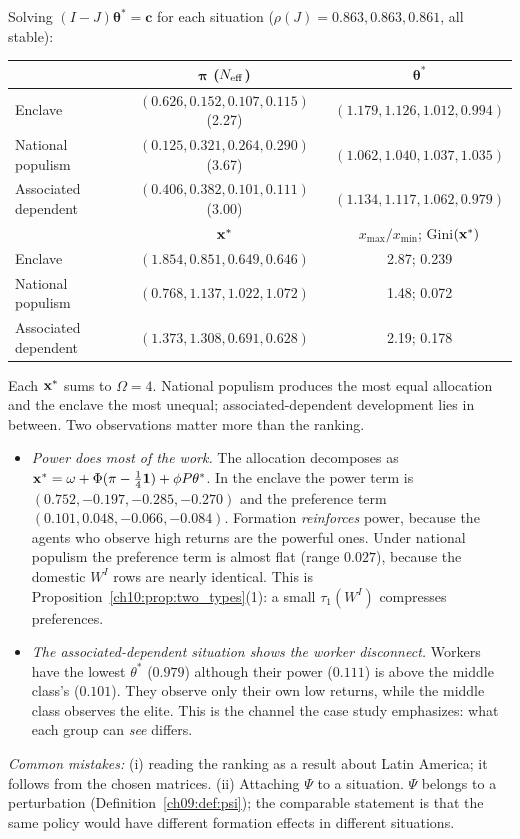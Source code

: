 \documentclass[../solutions_manual.tex]{subfiles}
\begin{document}
 Solving $(I - J)\boldsymbol{\theta}^* = \mathbf{c}$ for each situation ($\rho(J) = 0.863, 0.863, 0.861$, all stable):
\begin{center}
\small
\begin{tabular}{lcc}
\toprule
& $\boldsymbol{\pi}$ ($N_{\text{eff}}$) & $\boldsymbol{\theta}^*$ \\
\midrule
Enclave & $(0.626, 0.152, 0.107, 0.115)$ (2.27) & $(1.179, 1.126, 1.012, 0.994)$ \\
National populism & $(0.125, 0.321, 0.264, 0.290)$ (3.67) & $(1.062, 1.040, 1.037, 1.035)$ \\
Associated dependent & $(0.406, 0.382, 0.101, 0.111)$ (3.00) & $(1.134, 1.117, 1.062, 0.979)$ \\
\midrule
& $\mathbf{x}^*$ & $x_{\max}/x_{\min}$; Gini$(\mathbf{x}^*)$ \\
\midrule
Enclave & $(1.854, 0.851, 0.649, 0.646)$ & 2.87; 0.239 \\
National populism & $(0.768, 1.137, 1.022, 1.072)$ & 1.48; 0.072 \\
Associated dependent & $(1.373, 1.308, 0.691, 0.628)$ & 2.19; 0.178 \\
\bottomrule
\end{tabular}
\end{center}
Each $\mathbf{x}^*$ sums to $\Omega = 4$. National populism produces the most equal allocation and the enclave the most unequal; associated-dependent development lies in between. Two observations matter more than the ranking.
\begin{itemize}
\item \textit{Power does most of the work.} The allocation decomposes as $\mathbf{x}^* = \omega + \Phi(\pi - \tfrac14\mathbf{1}) + \phi P\theta^*$. In the enclave the power term is $(0.752, -0.197, -0.285, -0.270)$ and the preference term $(0.101, 0.048, -0.066, -0.084)$. Formation \emph{reinforces} power, because the agents who observe high returns are the powerful ones. Under national populism the preference term is almost flat (range $0.027$), because the domestic $W^I$ rows are nearly identical. This is Proposition~\ref{ch10:prop:two_types}(1): a small $\tau_1(W^I)$ compresses preferences.
\item \textit{The associated-dependent situation shows the worker disconnect.} Workers have the lowest $\theta^*$ ($0.979$) although their power ($0.111$) is above the middle class's ($0.101$). They observe only their own low returns, while the middle class observes the elite. This is the channel the case study emphasizes: what each group can \emph{see} differs.
\end{itemize}
\textit{Common mistakes:} (i) reading the ranking as a result about Latin America; it follows from the chosen matrices. (ii) Attaching $\Psi$ to a situation. $\Psi$ belongs to a perturbation (Definition~\ref{ch09:def:psi}); the comparable statement is that the same policy would have different formation effects in different situations.

\fussy
\end{document}

